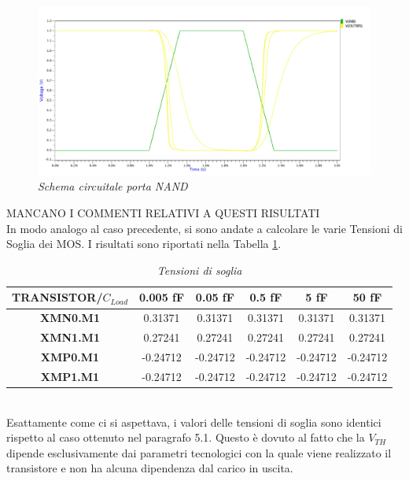 \begin{figure}[!htb]
	\centering
	\includegraphics[scale=0.09]{immagini/onde_5_2voltage}
	\caption{\textit{Schema circuitale porta NAND}}
	\label{onde_5_2voltage}
\end{figure}
MANCANO I COMMENTI RELATIVI A QUESTI RISULTATI\\
In modo analogo al caso precedente, si sono andate a calcolare le varie Tensioni di Soglia dei MOS. I risultati sono riportati nella Tabella \ref{Tab5_6}. \\
\begin{table}[!h]\footnotesize
	\centering
	\begin{tabular}{|c|c|c|c|c|c|}
		\hline
		\textbf{TRANSISTOR/$C_{Load}$} & \textbf{0.005 fF} & \textbf{0.05 fF} & \textbf{0.5 fF} & \textbf{5 fF} & \textbf{50 fF}\\
		\hline
		\textbf{XMN0.M1} &0.31371&0.31371&0.31371&0.31371&0.31371\\
		
		\textbf{XMN1.M1} &0.27241&0.27241&0.27241&0.27241&0.27241 \\
		
		\textbf{XMP0.M1}&-0.24712&-0.24712&-0.24712&-0.24712&-0.24712 \\
		
		\textbf{XMP1.M1}&-0.24712&-0.24712&-0.24712&-0.24712&-0.24712\\
			
			\hline
		\end{tabular}
		\caption{\textit{Tensioni di soglia}}
		\label{Tab5_6}
	\end{table}
\\
Esattamente come ci si aspettava, i valori delle tensioni di soglia sono identici rispetto al caso ottenuto nel paragrafo 5.1. Questo è dovuto al fatto che la $V_{TH}$ dipende esclusivamente dai parametri tecnologici con la quale viene realizzato il transistore e non ha alcuna dipendenza dal carico in uscita. 


